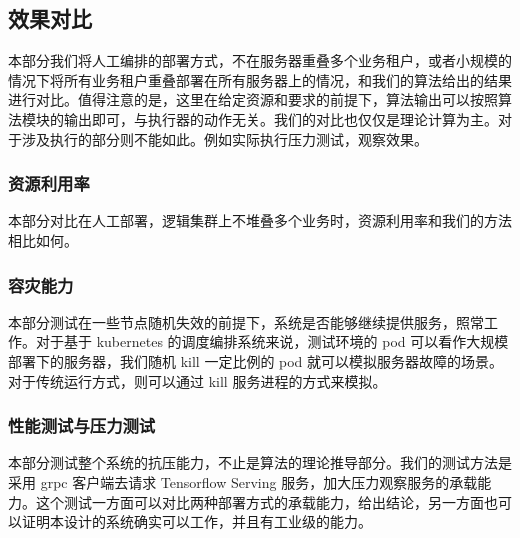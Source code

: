 
\subsection{效果对比}

本部分我们将人工编排的部署方式，不在服务器重叠多个业务租户，或者小规模的情况下将所有业务租户重叠部署在所有服务器上的情况，和我们的算法给出的结果进行对比。值得注意的是，这里在给定资源和要求的前提下，算法输出可以按照算法模块的输出即可，与执行器的动作无关。我们的对比也仅仅是理论计算为主。对于涉及执行的部分则不能如此。例如实际执行压力测试，观察效果。

\subsubsection{资源利用率}

本部分对比在人工部署，逻辑集群上不堆叠多个业务时，资源利用率和我们的方法相比如何。

\subsubsection{容灾能力}

本部分测试在一些节点随机失效的前提下，系统是否能够继续提供服务，照常工作。对于基于 kubernetes 的调度编排系统来说，测试环境的 pod 可以看作大规模部署下的服务器，我们随机 kill 一定比例的 pod 就可以模拟服务器故障的场景。对于传统运行方式，则可以通过 kill 服务进程的方式来模拟。

\subsubsection{性能测试与压力测试}

本部分测试整个系统的抗压能力，不止是算法的理论推导部分。我们的测试方法是采用 grpc 客户端去请求 Tensorflow Serving 服务，加大压力观察服务的承载能力。这个测试一方面可以对比两种部署方式的承载能力，给出结论，另一方面也可以证明本设计的系统确实可以工作，并且有工业级的能力。

